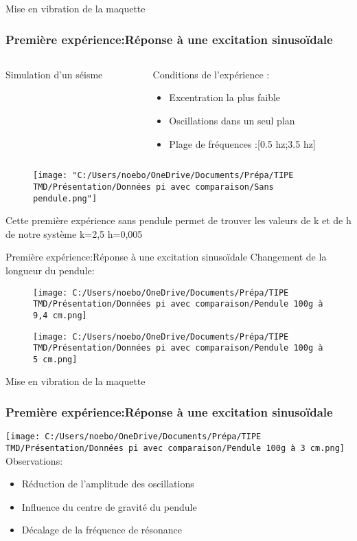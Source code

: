 \documentclass{beamer}
\begin{document}
\begin{frame}{Mise en vibration de la maquette}
	\frametitle{Première expérience:Réponse à une excitation sinusoïdale}
	\begin{columns}
		\begin{column}{0.35\textwidth}
			\alert{Simulation d'un séisme}
		\end{column}
		\begin{column}{0.7\textwidth}
			Conditions de l'expérience :
			\begin{itemize}
				\item Excentration la plus faible 
				\item Oscillations dans un seul plan
				\item Plage de fréquences :[0.5 hz;3.5 hz]
			\end{itemize}	
		\end{column}
	\end{columns}
	
	
	\begin{figure}
		\texttt{[image: "C:/Users/noebo/OneDrive/Documents/Prépa/TIPE TMD/Présentation/Données pi avec comparaison/Sans pendule.png"]}
		
	\end{figure}
Cette première expérience sans pendule permet de trouver les valeurs de k et de h de notre système 
k=2,5
h=0,005
\end{frame}

	
	\begin{frame}{Première expérience:Réponse à une excitation sinusoïdale}
	Changement de la longueur du pendule:

		
		\begin{figure}
		\centering
		\texttt{[image: C:/Users/noebo/OneDrive/Documents/Prépa/TIPE TMD/Présentation/Données pi avec comparaison/Pendule 100g à 9,4 cm.png]}
		
		
		\centering
		\texttt{[image: C:/Users/noebo/OneDrive/Documents/Prépa/TIPE TMD/Présentation/Données pi avec comparaison/Pendule 100g à 5 cm.png]}
		\end{figure}
	\end{frame}
	
	\begin{frame}{Mise en vibration de la maquette}
		\frametitle{Première expérience:Réponse à une excitation sinusoïdale}
		\centering
		\texttt{[image: C:/Users/noebo/OneDrive/Documents/Prépa/TIPE TMD/Présentation/Données pi avec comparaison/Pendule 100g à 3 cm.png]}
		\\
		\vspace{12pt}
		Observations:
		\begin{itemize}
			\item Réduction de l'amplitude des oscillations
			\item Influence du centre de gravité du pendule
			\item Décalage de la fréquence de résonance  
		\end{itemize}
		
	\end{frame}
\end{document}
